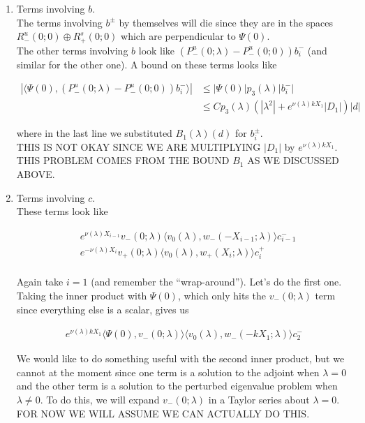 \documentclass[12pt]{article}
\begin{document}
\begin{enumerate}
\item Terms involving $b$.\\

The terms involving $b^\pm$ by themselves will die since they are in the spaces $R^u_-(0; 0) \oplus R^s_+(0; 0)$ which are perpendicular to $\Psi(0)$.\\

The other terms involving $b$ look like $(P^u_-(0; \lambda) - P^u_-(0; 0))b_i^-$ (and similar for the other one). A bound on these terms looks like

\begin{align*}
|\langle \Psi(0), (P^u_-(0; \lambda) - P^u_-(0; 0))b_i^- \rangle|
&\leq |\Psi(0)| p_3(\lambda)|b_i^-| \\
&\leq C p_3(\lambda) (|\lambda^2| + e^{\nu(\lambda)k X_1}|D_1|)|d|
\end{align*}

where in the last line we substituted $B_1(\lambda)(d)$ for $b_i^\pm$.\\

THIS IS NOT OKAY SINCE WE ARE MULTIPLYING $|D_1|$ by $e^{\nu(\lambda)k X_1}$. THIS PROBLEM COMES FROM THE BOUND $B_1$ AS WE DISCUSSED ABOVE.

\item Terms involving $c$.\\

These terms look like

\begin{align*}
&e^{\nu(\lambda)X_{i-1}} v_-(0; \lambda) \langle v_0(\lambda), w_-(-X_{i-1}; \lambda) \rangle c_{i-1}^- \\
&e^{-\nu(\lambda)X_i} v_+(0; \lambda) \langle v_0(\lambda), w_+(X_i; \lambda) \rangle c_i^+ \\
\end{align*}

Again take $i = 1$ (and remember the ``wrap-around''). Let's do the first one. Taking the inner product with $\Psi(0)$, which only hits the $v_-(0; \lambda)$ term since everything else is a scalar, gives us 

\begin{align*}
e^{\nu(\lambda)k X_1} \langle \Psi(0), v_-(0; \lambda) \rangle \langle v_0(\lambda), w_-(-k X_1; \lambda) \rangle c_2^- 
\end{align*}

We would like to do something useful with the second inner product, but we cannot at the moment since one term is a solution to the adjoint when $\lambda = 0$ and the other term is a solution to the perturbed eigenvalue problem when $\lambda \neq 0$. To do this, we will expand $v_-(0; \lambda)$ in a Taylor series about $\lambda = 0$. FOR NOW WE WILL ASSUME WE CAN ACTUALLY DO THIS.


\end{enumerate}
\end{document}
